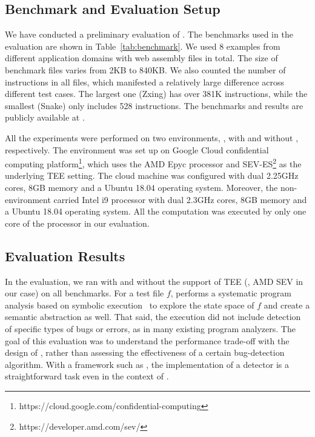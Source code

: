 \subsection{Benchmark and Evaluation Setup}
\label{subsec:bench}

We have conducted a preliminary evaluation of \tool. The benchmarks used in the 
evaluation are shown in Table~\ref{tab:benchmark}. We used 8 examples 
from different application domains with \neval web assembly files in total. 
The size of benchmark files varies from 2KB to 840KB. We also counted the number of 
\wasm instructions in all files, which manifested a relatively large difference across 
different test cases. The largest one (Zxing) has over 381K instructions, while the smallest 
(Snake) only includes 528 instructions. The benchmarks and results are publicly available at \dataset.



All the experiments were performed on two environments, \ie, with and without \tee, respectively. 
The \tee environment was set up on Google Cloud confidential computing 
platform\footnote{https://cloud.google.com/confidential-computing}, which uses 
the AMD Epyc processor and SEV-ES\footnote{https://developer.amd.com/sev/} as the underlying TEE setting. 
The cloud machine was configured with dual 2.25GHz cores, 8GB memory and a Ubuntu 18.04 
operating system. Moreover, the non-\tee environment carried Intel i9 processor with dual 2.3GHz 
cores, 8GB memory and a Ubuntu 18.04 operating system. All the computation was executed by only 
one core of the processor in our evaluation.

\subsection{Evaluation Results}
\label{subsec:results}
In the evaluation, we ran \tool with and without the support of TEE (\ie, AMD SEV 
in our case) on all benchmarks. For a test file $f$, \tool performs a systematic 
program analysis based on symbolic execution~\cite{king1976symbolic} to explore the 
state space of $f$ and create a semantic abstraction as well. That said, the execution 
did not include detection of specific types of bugs or errors, as in many existing program 
analyzers. The goal of this evaluation was to understand the performance trade-off with the 
design of \tcpa, rather than assessing the effectiveness of a certain bug-detection algorithm.
With a framework such as \tool, the implementation of a detector is a straightforward task 
even in the context of \tcpa.

